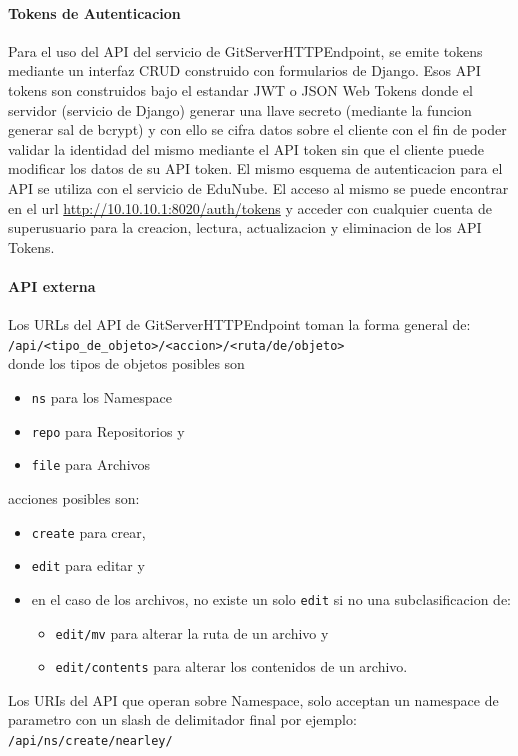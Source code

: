 \paragraph{Tokens de Autenticacion}
Para el uso del API del servicio de GitServerHTTPEndpoint, se emite tokens mediante un interfaz CRUD construido con formularios de Django. Esos API tokens son construidos bajo el estandar JWT o JSON Web Tokens donde el servidor (servicio de Django) generar una llave secreto (mediante la funcion generar sal de bcrypt) y con ello se cifra datos sobre el cliente con el fin de poder validar la identidad del mismo mediante el API token sin que el cliente puede modificar los datos de su API token. El mismo esquema de autenticacion para el API se utiliza con el servicio de EduNube. El acceso al mismo se puede encontrar en el url \url{http://10.10.10.1:8020/auth/tokens} y acceder con cualquier cuenta de superusuario para la creacion, lectura, actualizacion y eliminacion de los API Tokens.

\paragraph{API externa}
Los URLs del API de GitServerHTTPEndpoint toman la forma general de: 
\texttt{/api/<tipo\_de\_objeto>/<accion>/<ruta/de/objeto>}\\
donde los tipos de objetos posibles son
\begin{itemize}
	\item \texttt{ns} para los Namespace
    \item \texttt{repo} para Repositorios y
    \item \texttt{file} para Archivos
\end{itemize}
acciones posibles son:
\begin{itemize}
	\item \texttt{create} para crear,
	\item \texttt{edit} para editar y
    \item en el caso de los archivos, no existe un solo \texttt{edit} si no una subclasificacion de:
    \begin{itemize}
    	\item \texttt{edit/mv}
        para alterar la ruta de un archivo y 
        \item \texttt{edit/contents}
        para alterar los contenidos de un archivo.
    \end{itemize}
\end{itemize}

Los URIs del API que operan sobre Namespace, solo acceptan un namespace de parametro con un slash de delimitador final por ejemplo: \\
\texttt{/api/ns/create/nearley/}

